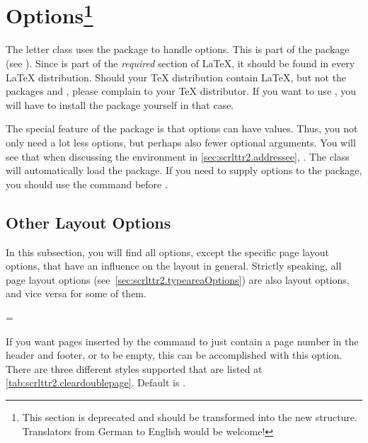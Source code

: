 \section{Options\protect\footnote{This section is
  deprecated and should be transformed into the new structure. Translators
  from German to English would be welcome!}}
\label{sec:scrlttr2.options}

The letter class  uses the package
 to handle options. This is part
of the  package (see \cite{package:graphics}). Since
 is part of the \emph{required} section of {\LaTeX},
it should be found in every {\LaTeX} distribution. Should your {\TeX}
distribution contain {\LaTeX}, but not the packages 
and , please complain to your {\TeX} distributor. If
you want to use , you will have to install the
 package yourself in that case.

\begin{Explain}
  The special feature of the  package is that options
  can have values. Thus, you not only need a lot less options, but
  perhaps also fewer optional arguments. You will see that when
  discussing the  environment in
  \autoref{sec:scrlttr2.addressee},
  . The class will
  automatically load the  package. If you need to
  supply options to the  package, you should use the
   command before .
\end{Explain}


\subsection{Other Layout Options}
\label{sec:scrlttr2.layout}

In this subsection, you will find all options, except the specific
page layout options, that have an influence on the layout in
general. Strictly speaking, all page layout options
(see~\ref{sec:scrlttr2.typeareaOptions}) are also layout options, and
vice versa for some of them.

\begin{Declaration}
  =
\end{Declaration}
%
If you want pages inserted by the  command to
just contain a page number in the header and footer, or to be empty,
this can be accomplished with this option. There are three different
styles supported that are listed at
\autoref{tab:scrlttr2.cleardoublepage}. Default is .

